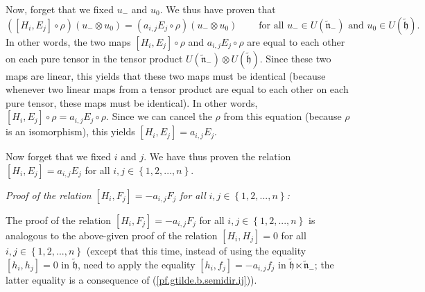 \documentclass[etingof-lie.tex]{subfiles}
\begin{document}
\begin{verlong}
Now, forget that we fixed $u_{-}$ and $u_{0}$. We thus have proven that%
\[
\left(  \left[  H_{i},E_{j}\right]  \circ\rho\right)  \left(  u_{-}\otimes
u_{0}\right)  =\left(  a_{i,j}E_{j}\circ\rho\right)  \left(  u_{-}\otimes
u_{0}\right)  \ \ \ \ \ \ \ \ \ \ \text{for all }u_{-}\in U\left(
\widetilde{\mathfrak{n}}_{-}\right)  \text{ and }u_{0}\in U\left(
\widetilde{\mathfrak{h}}\right)  .
\]
In other words, the two maps $\left[  H_{i},E_{j}\right]  \circ\rho$ and
$a_{i,j}E_{j}\circ\rho$ are equal to each other on each pure tensor in the
tensor product $U\left(  \widetilde{\mathfrak{n}}_{-}\right)  \otimes U\left(
\widetilde{\mathfrak{h}}\right)  $. Since these two maps are linear, this
yields that these two maps must be identical (because whenever two linear maps
from a tensor product are equal to each other on each pure tensor, these maps
must be identical). In other words, $\left[  H_{i},E_{j}\right]  \circ
\rho=a_{i,j}E_{j}\circ\rho$. Since we can cancel the $\rho$ from this equation
(because $\rho$ is an isomorphism), this yields $\left[  H_{i},E_{j}\right]
=a_{i,j}E_{j}$.
\end{verlong}

Now forget that we fixed $i$ and $j$. We have thus proven the relation
$\left[  H_{i},E_{j}\right]  =a_{i,j}E_{j}$ for all $i,j\in\left\{
1,2,...,n\right\}  $.

\bigskip

\textit{Proof of the relation }$\left[  H_{i},F_{j}\right]  =-a_{i,j}F_{j}$
\textit{for all }$i,j\in\left\{  1,2,...,n\right\}  $\textit{:}

\begin{vershort}
The proof of the relation $\left[  H_{i},F_{j}\right]  =-a_{i,j}F_{j}$ for all
$i,j\in\left\{  1,2,...,n\right\}  $ is analogous to the above-given proof of
the relation $\left[  H_{i},H_{j}\right]  =0$ for all $i,j\in\left\{
1,2,...,n\right\}  $ (except that this time, instead of using the equality
$\left[  h_{i},h_{j}\right]  =0$ in $\widetilde{\mathfrak{h}}$, need to apply
the equality $\left[  h_{i},f_{j}\right]  =-a_{i,j}f_{j}$ in
$\widetilde{\mathfrak{h}}\ltimes\widetilde{\mathfrak{n}}_{-}$; the latter
equality is a consequence of (\ref{pf.gtilde.b.semidir.ij})).
\end{vershort}
\end{document}
